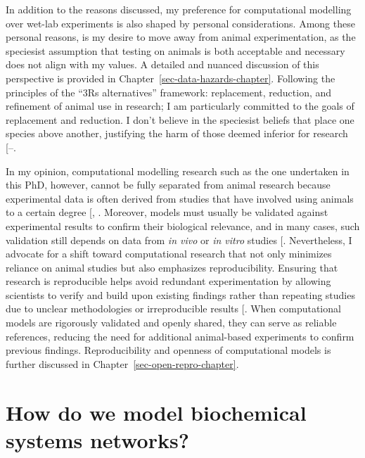 \documentclass[
  11pt,
  letterpaper,
]{scrreprt}
\begin{document}
In addition to the reasons discussed, my preference for computational
modelling over wet-lab experiments is also shaped by personal
considerations. Among these personal reasons, is my desire to move away
from animal experimentation, as the speciesist assumption that testing
on animals is both acceptable and necessary does not align with my
values. A detailed and nuanced discussion of this perspective is
provided in Chapter~\ref{sec-data-hazards-chapter}. Following the
principles of the ``3Rs alternatives'' framework: replacement,
reduction, and refinement of animal use in research; I am particularly
committed to the goals of replacement and reduction. I don't believe in
the speciesist beliefs that place one species above another, justifying
the harm of those deemed inferior for research
{[}--\citeproc{ref-jaquet2021Debunking}{258}{]}.

In my opinion, computational modelling research such as the one
undertaken in this PhD, however, cannot be fully separated from animal
research because experimental data is often derived from studies that
have involved using animals to a certain degree
{[},
\citeproc{ref-mukherjee2022Role}{260}{]}. Moreover, models must usually
be validated against experimental results to confirm their biological
relevance, and in many cases, such validation still depends on data from
\emph{in vivo} or \emph{in vitro} studies
{[}\citeproc{ref-madden2020Review}{261}{]}. Nevertheless, I advocate for
a shift toward computational research that not only minimizes reliance
on animal studies but also emphasizes reproducibility. Ensuring that
research is reproducible helps avoid redundant experimentation by
allowing scientists to verify and build upon existing findings rather
than repeating studies due to unclear methodologies or irreproducible
results {[}\citeproc{ref-pound2004Where}{262}{]}. When computational
models are rigorously validated and openly shared, they can serve as
reliable references, reducing the need for additional animal-based
experiments to confirm previous findings. Reproducibility and openness
of computational models is further discussed in
Chapter~\ref{sec-open-repro-chapter}.

\section{How do we model biochemical systems
networks?}\label{sec-how-do-we-model}
\end{document}
